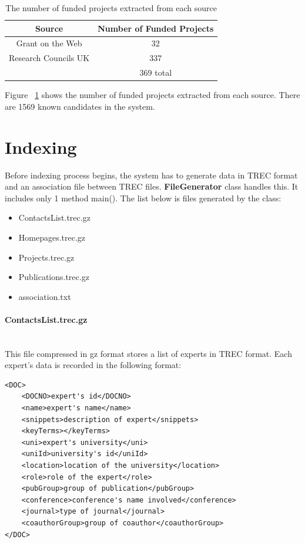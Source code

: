 \begin{table}
\centering
\begin{tabular}{|c|c|}
\hline \textbf{Source} & \textbf{Number of Funded Projects} \\
\hline Grant on the Web & 32 \\
\hline Research Councils UK & 337 \\
\hline   & 369 total \\ 
\hline
\end{tabular}
\caption{The number of funded projects extracted from each source} \label{table:stats}
\end{table}
Figure ~\ref{table:stats} shows the number of funded projects extracted from each source. There are 1569 known candidates in the system.

\section{Indexing}

Before indexing process begins, the system has to generate data in TREC format and an association file between TREC files. \textbf{FileGenerator} class
handles this. It includes only 1 method main(). The list below is files generated by the class:
\begin{itemize}
 \item ContactsList.trec.gz
 \item Homepages.trec.gz
 \item Projects.trec.gz
 \item Publications.trec.gz
 \item association.txt
\end{itemize}

\paragraph{ContactsList.trec.gz} \hspace{0pt} \\
This file compressed in gz format stores a list of experts in TREC format. Each expert's data is recorded in the following format:
\begin{verbatim}
<DOC>
	<DOCNO>expert's id</DOCNO>
	<name>expert's name</name>
	<snippets>description of expert</snippets>
	<keyTerms></keyTerms>
	<uni>expert's university</uni>
	<uniId>university's id</uniId>
	<location>location of the university</location>
	<role>role of the expert</role>
	<pubGroup>group of publication</pubGroup>
	<conference>conference's name involved</conference>
	<journal>type of journal</journal>
	<coauthorGroup>group of coauthor</coauthorGroup>
</DOC>
\end{verbatim}

